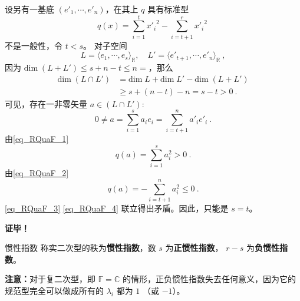 设另有一基底 $( e'_1,\cdots, e'_n)$，在其上 $q$ 具有标准型
\begin{equation}\label{eq_RQuaF_2}
q( x)=\sum_{i=1}^{t}{x'_i}^2-\sum_{i=t+1}^{r} {x'_{i}}^{2}~
\end{equation}
不是一般性，令 $t<s$。
对子空间
\begin{equation}
L=\langle  e_1,\cdots, e_s\rangle_\mathbb{R},\quad L'=\langle  e'_{t+1},\cdots, e'_n\rangle_\mathbb{R}~,
\end{equation}
因为 $\mathrm{dim}\;(L+L')\leq s+n-t\leq n=$，那么
\begin{equation}
\begin{aligned}
\mathrm{dim}\;(L\cap L')&=\mathrm{dim}\; L+\mathrm{dim}\; L'-\mathrm{dim}\;(L+L')\\
&\geq s+(n-t)-n=s-t> 0~.
\end{aligned}
\end{equation}
可见，存在一非零矢量 $ a\in(L\cap L')$:
\begin{equation}
 0\neq a=\sum_{i=1}^s a_i e_i=\sum_{i=t+1}^n a'_i  e'_i~.
\end{equation}
由\autoref{eq_RQuaF_1} 
\begin{equation}\label{eq_RQuaF_3}
q( a)=\sum_{i=1}^s a_i^2>0~.
\end{equation}
由\autoref{eq_RQuaF_2} 
\begin{equation}\label{eq_RQuaF_4}
q( a)=-\sum_{i=t+1}^n a_i^2\leq 0~.
\end{equation}
\autoref{eq_RQuaF_3} \autoref{eq_RQuaF_4} 联立得出矛盾。因此，只能是 $s=t$。

\textbf{证毕！}
\begin{definition}{惯性指数}\label{def_RQuaF_1}
称实二次型的秩为\textbf{惯性指数}，数 $s$ 为\textbf{正惯性指数}， $r-s$ 为\textbf{负惯性指数}。
\end{definition}

\textbf{注意：}对于复二次型，即 $\mathbb F=\mathbb C$ 的情形，正负惯性指数失去任何意义，因为它的规范型完全可以做成所有的 $\lambda_i$ 都为 $1$ （或 $-1$）。
